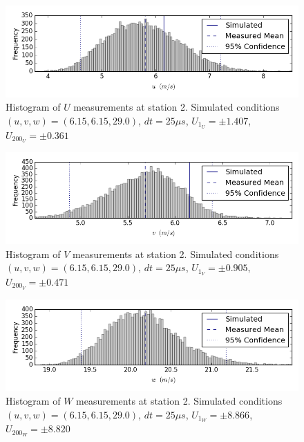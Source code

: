 \begin{figure}[H]
\centering
\includegraphics[width=6in]{figs/Ely_May28th02001/uncertainty_Ely_May28th02001_U}
\caption{Histogram of $U$ measurements at station 2. Simulated conditions $(u,v,w)=(6.15, 6.15, 29.0)$, $dt=25 \mu s$, $U_1_U=\pm 1.407$, $U_200_U=\pm 0.361$}
\label{fig:uncertainty_Ely_May28th02001_U}
\end{figure}


\begin{figure}[H]
\centering
\includegraphics[width=6in]{figs/Ely_May28th02001/uncertainty_Ely_May28th02001_V}
\caption{Histogram of $V$ measurements at station 2. Simulated conditions $(u,v,w)=(6.15, 6.15, 29.0)$, $dt=25 \mu s$, $U_1_V=\pm 0.905$, $U_200_V=\pm 0.471$}
\label{fig:uncertainty_Ely_May28th02001_V}
\end{figure}


\begin{figure}[H]
\centering
\includegraphics[width=6in]{figs/Ely_May28th02001/uncertainty_Ely_May28th02001_W}
\caption{Histogram of $W$ measurements at station 2. Simulated conditions $(u,v,w)=(6.15, 6.15, 29.0)$, $dt=25 \mu s$, $U_1_W=\pm 8.866$, $U_200_W=\pm 8.820$}
\label{fig:uncertainty_Ely_May28th02001_W}
\end{figure}



